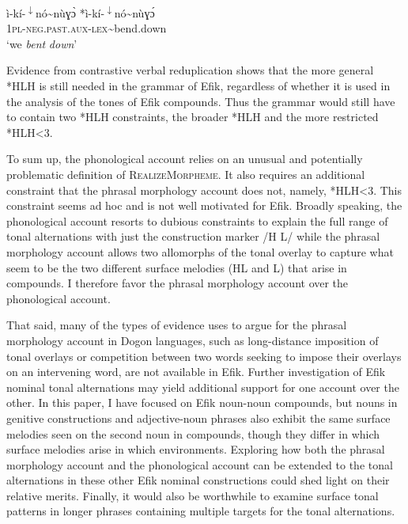 \documentclass[output=paper]{langscibook}
\begin{document}
\ea\label{ex:glewwe:9} 
\gll ì-kí-\textsuperscript{$\downarrow$}nó{\textasciitilde}nùɣɔ̀ \hspace{1.5cm}       *ì-kí-\textsuperscript{$\downarrow$}nó{\textasciitilde}nùɣɔ́\\
     \textsc{1pl-neg.past.aux-lex{\textasciitilde}}\textup{bend.down}\\
\glt ‘we \textit{bent} \textit{down}’
\z

Evidence from contrastive verbal reduplication shows that the more general *HLH is still needed in the grammar of Efik, regardless of whether it is used in the analysis of the tones of Efik compounds. Thus the grammar would still have to contain two *HLH constraints, the broader *HLH and the more restricted *HLH<3.

To sum up, the phonological account relies on an unusual and potentially problematic definition of \textsc{RealizeMorpheme}. It also requires an additional constraint that the phrasal morphology account does not, namely, *HLH<3. This constraint seems ad hoc and is not well motivated for Efik. Broadly speaking, the phonological account resorts to dubious constraints to explain the full range of tonal alternations with just the construction marker /H L/ while the phrasal morphology account allows two allomorphs of the tonal overlay to capture what seem to be the two different surface melodies (HL and L) that arise in compounds. I therefore favor the phrasal morphology account over the phonological account. 

That said, many of the types of evidence \citet{McPherson2014} uses to argue for the phrasal morphology account in Dogon languages, such as long-distance imposition of tonal overlays or competition between two words seeking to impose their overlays on an intervening word, are not available in Efik. Further investigation of Efik nominal tonal alternations may yield additional support for one account over the other. In this paper, I have focused on Efik noun-noun compounds, but nouns in genitive constructions and adjective-noun phrases also exhibit the same surface melodies seen on the second noun in compounds, though they differ in which surface melodies arise in which environments. Exploring how both the phrasal morphology account and the phonological account can be extended to the tonal alternations in these other Efik nominal constructions could shed light on their relative merits. Finally, it would also be worthwhile to examine surface tonal patterns in longer phrases containing multiple targets for the tonal alternations.
\end{document}
